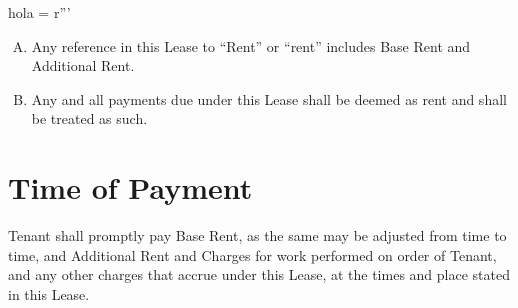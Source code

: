 hola = r'''\documentclass{article}
\begin{document}
\begin{enumerate}[(A)]
        \item	Any reference in this Lease to ``Rent'' or ``rent'' includes Base Rent and Additional Rent.

        \item	Any and all payments due under this Lease shall be deemed as rent and shall be treated as such. 
    
    \end{enumerate}

\section{Time of Payment}
    Tenant shall promptly pay Base Rent, as the same may be adjusted from time to time, and Additional Rent and Charges for work performed on order of Tenant, and any other charges that accrue under this Lease, at the times and place stated in this Lease.
    
\end{document}
